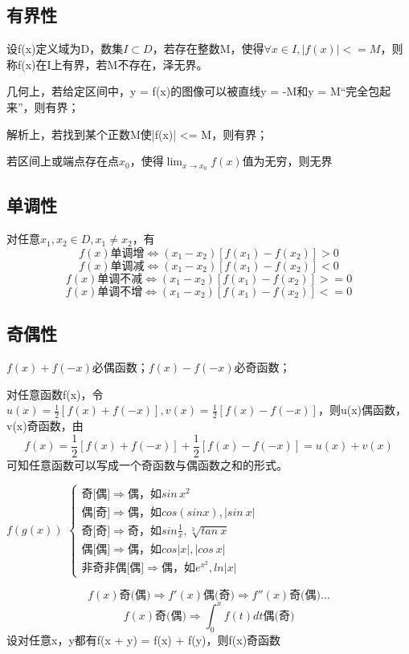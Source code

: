 \subsection{有界性}

设f(x)定义域为D，数集\(I \subset D\)，若存在整数M，使得\(\forall x \in I, |f(x)| <= M\)，则称f(x)在I上有界，若M不存在，泽无界。

几何上，若给定区间中，y = f(x)的图像可以被直线y = -M和y = M“完全包起来”，则有界；

解析上，若找到某个正数M使|f(x)| <= M，则有界；

若区间上或端点存在点\(x_0\)，使得\(\lim_{x \to x_0} f(x)\)值为无穷，则无界


\subsection{单调性}

对任意\(x_1, x_2 \in D, x_1 \neq x_2\)，有
\[f(x)\text{单调增} \Leftrightarrow (x_1 - x_2)[f(x_1) - f(x_2)] > 0\]
\[f(x)\text{单调减} \Leftrightarrow (x_1 - x_2)[f(x_1) - f(x_2)] < 0\]
\[f(x)\text{单调不减} \Leftrightarrow (x_1 - x_2)[f(x_1) - f(x_2)] >= 0\]
\[f(x)\text{单调不增} \Leftrightarrow (x_1 - x_2)[f(x_1) - f(x_2)] <= 0\]


\subsection{奇偶性}
\(f(x) + f(-x)\)必偶函数；\(f(x) - f(-x)\)必奇函数；

对任意函数f(x)，令\(u(x) = \frac{1}{2}[f(x) + f(-x)], v(x) = \frac{1}{2}[f(x) - f(-x)]\)，则u(x)偶函数，v(x)奇函数，由\[f(x) = \frac{1}{2}[f(x) + f(-x)] + \frac{1}{2}[f(x) - f(-x)] = u(x) + v(x)\]可知任意函数可以写成一个奇函数与偶函数之和的形式。

\(f(g(x))\)
\(
\begin{cases}
\text{奇[偶]}\Rightarrow \text{偶，如}sin\,x^2 \\ 
\text{偶[奇]}\Rightarrow \text{偶，如}cos(sinx),|sin\ x| \\ 
\text{奇[奇]}\Rightarrow \text{奇，如}sin\frac{1}{x}, \sqrt[3]{tan\ x} \\ 
\text{偶[偶]}\Rightarrow \text{偶，如}cos|x|, |cos\ x| \\ 
\text{非奇非偶[偶]}\Rightarrow \text{偶，如}e^{x^2}, ln|x|
\end{cases}
\)

\[f(x)\text{奇(偶)} \Rightarrow f'(x)\text{偶(奇)} \Rightarrow f''(x)\text{奇(偶)} ...\]
\[f(x)\text{奇(偶)} \Rightarrow \int_0^x f(t)dt\text{偶(奇)}\]
设对任意x，y都有f(x + y) = f(x) + f(y)，则f(x)奇函数


